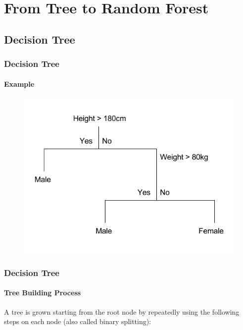 \section{From Tree to Random Forest}
\subsection{Decision Tree}

\begin{frame}
	\frametitle{Decision Tree}
	\framesubtitle{Example}
	\begin{figure}		
		\includegraphics[height=0.7\textheight]{images/decision_tree_example.png}
	\end{figure}
\end{frame}

\begin{frame}
	\frametitle{Decision Tree}
	\framesubtitle{Tree Building Process}
	A tree is grown starting from the root node by repeatedly 
	using the following steps on each node (also called binary splitting):
	\smallbreak
	\begin{enumerate}
	\end{enumerate}
\end{frame}	

